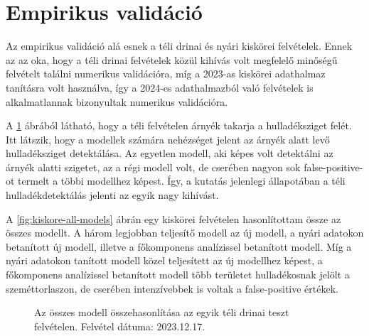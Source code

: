 \section{Empirikus validáció}
\label{ch:empirical-validation}
Az empirikus validáció alá esnek a téli drinai és nyári kiskörei felvételek. Ennek az az oka, hogy a téli drinai felvételek közül kihívás volt megfelelő minőségű felvételt találni numerikus validációra, míg a 2023-as kiskörei adathalmaz tanításra volt használva, így a 2024-es adathalmazból való felvételek is alkalmatlannak bizonyultak numerikus validációra. 

A \ref{fig:drina-winter-all-models} ábrából látható, hogy a téli felvételen árnyék takarja a hulladéksziget felét. Itt látszik, hogy a modellek számára nehézséget jelent az árnyék alatt levő hulladéksziget detektálása. Az egyetlen modell, aki képes volt detektálni az árnyék alatti szigetet, az a régi modell volt, de cserében nagyon sok false-positive-ot termelt a többi modellhez képest. Így, a kutatás jelenlegi állapotában a téli hulladékdetektálás jelenti az egyik nagy kihívást.

A \ref{fig:kiskore-all-models} ábrán egy kiskörei felvételen hasonlítottam össze az összes modellt. A három legjobban teljesítő modell az új modell, a nyári adatokon betanított új modell, illetve a főkomponens analízissel betanított modell. Míg a nyári adatokon tanított modell közel teljesített az új modellhez képest, a főkomponens analízissel betanított modell több területet hulladékosnak jelölt a szeméttorlaszon, de cserében intenzívebbek is voltak a false-positive értékek.

\begin{figure}[H]
	\centering
	\hspace{5pt}
	\hspace{5pt}
	\hspace{5pt}
	\hspace{5pt}
	\hspace{5pt}
	\caption{Az összes modell összehasonlítása az egyik téli drinai teszt felvételen. Felvétel dátuma: 2023.12.17.}
	\label{fig:drina-winter-all-models}
\end{figure}

